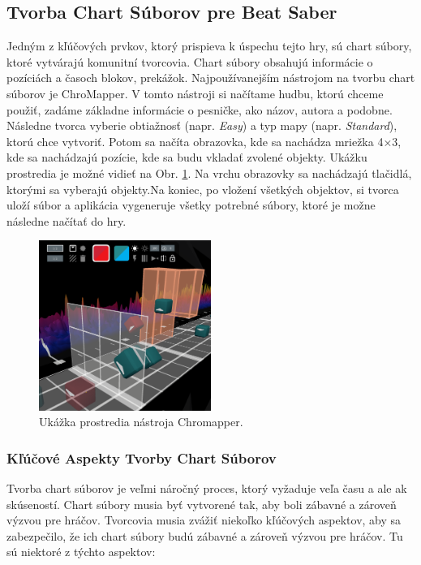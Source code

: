 \subsection{Tvorba Chart Súborov pre Beat Saber}

Jedným z kľúčových prvkov, ktorý prispieva k úspechu tejto hry, sú chart súbory, ktoré vytvárajú komunitní tvorcovia. Chart súbory obsahujú informácie o pozíciách a časoch blokov, prekážok. Najpoužívanejším nástrojom na tvorbu chart súborov je ChroMapper. V tomto nástroji si načítame hudbu, ktorú chceme použiť, zadáme základne informácie o pesničke, ako názov, autora a podobne. Následne tvorca vyberie obtiažnosť (napr. \textit{Easy}) a typ mapy (napr. \textit{Standard}), ktorú chce vytvoriť. Potom sa načíta obrazovka, kde sa nachádza mriežka 4×3, kde sa nachádzajú pozície, kde sa budu vkladať zvolené objekty. Ukážku prostredia je možné vidieť na Obr. \ref{fig:chromapper}. Na vrchu obrazovky sa nachádzajú tlačidlá, ktorými sa vyberajú objekty.Na koniec, po vložení všetkých objektov, si tvorca uloží súbor a aplikácia vygeneruje všetky potrebné súbory, ktoré je možne následne načítať do hry.

\begin{figure}[H]
  \centerline{\includegraphics[width=0.5\textwidth]{images/chromapper.png}}
  \caption{Ukážka prostredia nástroja Chromapper.}
  \label{fig:chromapper}
  \end{figure}

\subsubsection{Kľúčové Aspekty Tvorby Chart Súborov}

Tvorba chart súborov je veľmi náročný proces, ktorý vyžaduje veľa času a ale ak skúseností. Chart súbory musia byť vytvorené tak, aby boli zábavné a zároveň výzvou pre hráčov. Tvorcovia musia zvážiť niekoľko kľúčových aspektov, aby sa zabezpečilo, že ich chart súbory budú zábavné a zároveň výzvou pre hráčov. Tu sú niektoré z týchto aspektov:

